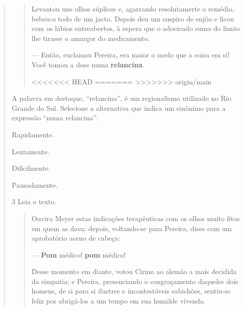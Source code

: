 \begin{quote}
\begin{quote}
Levantou uns olhos súplices e, agarrando resolutamerte o remédio,
bebeu-o todo de um jacto. Depois deu um suspiro de enjôo e ficou com os
lábios entreabertos, à espera que o adocicado sumo do limão lhe tirasse
o amargor do medicamento.

--- Então, exclamou Pereira, era maior o medo que a coisa em si! Você
tomou a dose numa \textbf{relancina}.

<<<<<<< HEAD
=======
>>>>>>> origin/main
\end{quote}

A palavra em destaque, “relancina”, é um regionalismo
utilizado no Rio Grande do Sul. Selecione a alternativa que indica um sinônimo
para a expressão “numa relancina”.

\begin{minipage}{.5\textwidth}
\begin{escolha}
\item Rapidamente.

\item Lentamente.

\item Dificilmente.

\item Pausadamente.
\end{escolha}
\end{minipage}

\num{3} Leia o texto.

\begin{quote}
Ouvira Meyer estas indicações terapêuticas com os olhos muito fitos em
quem as dava: depois, voltando-se para Pereira, disse com um aprobatório
aceno de cabeça:

--- \textbf{Pom} médico! \textbf{pom} médico!

Desse momento em diante, votou Cirino ao alemão a mais decidida da
simpatia; e Pereira, presenciando o congraçamento daqueles dois homens,
de si para si ilustres e incontestáveis sabichões, sentiu-se feliz por
abrigá-los a um tempo em sua humilde vivenda.


\end{quote}
\end{quote}
